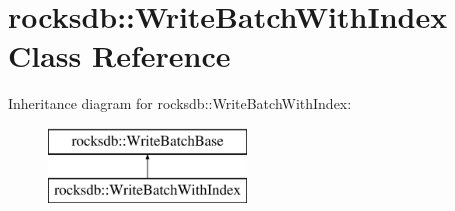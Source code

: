 \hypertarget{classrocksdb_1_1WriteBatchWithIndex}{}\section{rocksdb\+:\+:Write\+Batch\+With\+Index Class Reference}
\label{classrocksdb_1_1WriteBatchWithIndex}
Inheritance diagram for rocksdb\+:\+:Write\+Batch\+With\+Index\+:\begin{figure}[H]
\begin{center}
\leavevmode
\includegraphics[height=2.000000cm]{classrocksdb_1_1WriteBatchWithIndex}
\end{center}
\end{figure}
